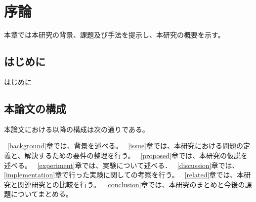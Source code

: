 \chapter{序論}
\label{introduction}

本章では本研究の背景、課題及び手法を提示し、本研究の概要を示す。

\section{はじめに}
\label{introduction:background}
はじめに

\section{本論文の構成}

本論文における以降の構成は次の通りである。

~\ref{background}章では、背景を述べる。
~\ref{issue}章では、本研究における問題の定義と、解決するための要件の整理を行う。
~\ref{proposed}章では、本研究の仮説を述べる。
~\ref{experiment}章では、実験について述べる．
~\ref{discussion}章では、\ref{implementation}章で行った実験に関しての考察を行う。
~\ref{related}章では、本研究と関連研究との比較を行う。
~\ref{conclusion}章では、本研究のまとめと今後の課題についてまとめる。


